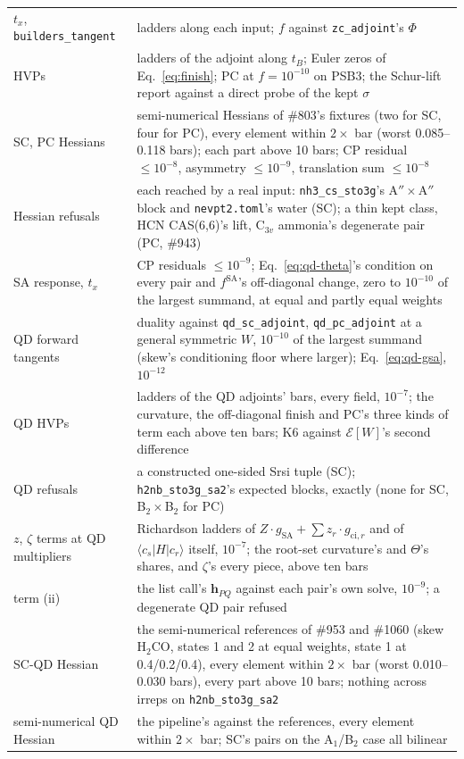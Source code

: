 \documentclass[11pt]{article}
\newcommand{\code}[1]{\texttt{#1}}
\begin{document}
\begin{center}
\begin{tabularx}{\linewidth}{@{}lX@{}}
$t_x$, \code{builders\_tangent} & ladders along each input; $f$ against \code{zc\_adjoint}'s $\Phi$ \\
HVPs & ladders of the adjoint along $t_B$; Euler zeros of Eq.~\eqref{eq:finish}; PC at $f = 10^{-10}$ on PSB3; the Schur-lift report against a direct probe of the kept $\sigma$ \\
SC, PC Hessians & semi-numerical Hessians of \#803's fixtures (two for SC, four for PC), every element within $2\times$ bar (worst 0.085--0.118 bars); each part above 10 bars; CP residual $\le 10^{-8}$, asymmetry $\le 10^{-9}$, translation sum $\le 10^{-8}$ \\
Hessian refusals & each reached by a real input: \code{nh3\_cs\_sto3g}'s A$''\times$A$''$ block and \code{nevpt2.toml}'s water (SC); a thin kept class, HCN CAS(6,6)'s lift, C$_{3v}$ ammonia's degenerate pair (PC, \#943) \\
SA response, $t_x$ & CP residuals $\le 10^{-9}$; Eq.~\eqref{eq:qd-theta}'s condition on every pair and $f^{\mathrm{SA}}$'s off-diagonal change, zero to $10^{-10}$ of the largest summand, at equal and partly equal weights \\
QD forward tangents & duality against \code{qd\_sc\_adjoint}, \code{qd\_pc\_adjoint} at a general symmetric $W$, $10^{-10}$ of the largest summand (skew's conditioning floor where larger); Eq.~\eqref{eq:qd-gsa}, $10^{-12}$ \\
QD HVPs & ladders of the QD adjoints' bars, every field, $10^{-7}$; the curvature, the off-diagonal finish and PC's three kinds of term each above ten bars; K6 against $\mathcal E[W]$'s second difference \\
QD refusals & a constructed one-sided Srsi tuple (SC); \code{h2nb\_sto3g\_sa2}'s expected blocks, exactly (none for SC, B$_2\times$B$_2$ for PC) \\
$z$, $\zeta$ terms at QD multipliers & Richardson ladders of $Z\cdot g_{\mathrm{SA}} + \sum z_r\cdot g_{\mathrm{ci},r}$ and of $\langle c_s|H|c_r\rangle$ itself, $10^{-7}$; the root-set curvature's and $\Theta$'s shares, and $\zeta$'s every piece, above ten bars \\
term (ii) & the list call's $\mathbf h_{PQ}$ against each pair's own solve, $10^{-9}$; a degenerate QD pair refused \\
SC-QD Hessian & the semi-numerical references of \#953 and \#1060 (skew H$_2$CO, states 1 and 2 at equal weights, state 1 at 0.4/0.2/0.4), every element within $2\times$ bar (worst 0.010--0.030 bars), every part above 10 bars; nothing across irreps on \code{h2nb\_sto3g\_sa2} \\
semi-numerical QD Hessian & the pipeline's against the references, every element within $2\times$ bar; SC's pairs on the A$_1$/B$_2$ case all bilinear \\
\bottomrule
\end{tabularx}
\end{center}
\end{document}
